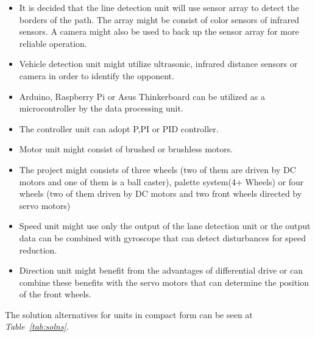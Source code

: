 \documentclass[a4paper,12pt]{article}
\begin{document}
	\begin{itemize}
		\item It is decided that the line detection unit will use sensor array to detect the borders of the path. The array might be consist of color sensors of infrared sensors. A camera might also be used to back up the sensor array for more reliable operation.	
		\item Vehicle detection unit might utilize ultrasonic, infrared distance sensors or camera in order to identify the opponent.
		\item  Arduino, Raspberry Pi or Asus Thinkerboard can be utilized as a microcontroller by the data processing unit.
		\item The controller unit can adopt P,PI or PID controller.
		\item Motor unit might consist of brushed or brushless motors.
		\item The project might consists of three wheels (two of them are driven by DC motors and one of them is a ball caster), palette system(4+ Wheels) or four wheels (two of them driven by DC motors and two front wheels directed by servo motors)
		\item Speed unit might use only the output of the lane detection unit or the output data can be combined with gyroscope that can detect disturbances for speed reduction.  
		\item Direction unit might benefit from the advantages of differential drive or can combine these benefits with the servo motors that can determine the position of the front wheels.
	\end{itemize}	  
			
		The solution alternatives for units in compact form can be seen at \textit{Table~\ref{tab:solns}}.
	
\end{document}
